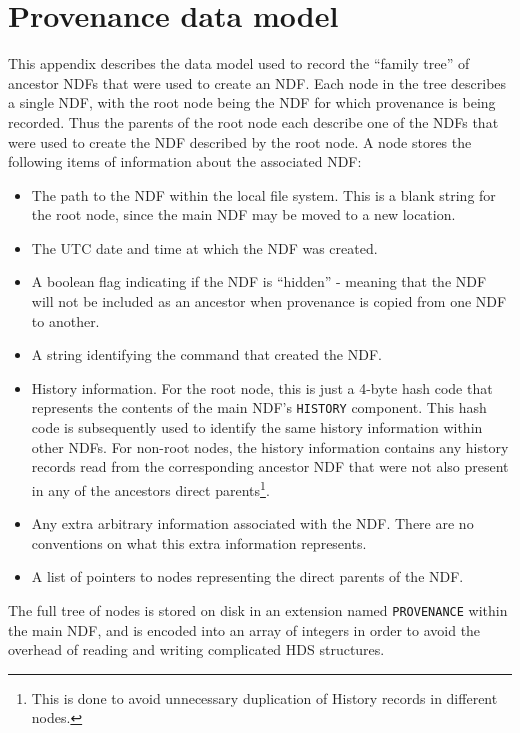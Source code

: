 \documentclass[final,authoryear,5p,times,twocolumn]{elsarticle}
\begin{document}
\section{Provenance data model}
\label{app:prov}

This appendix describes the data model used to record the ``family tree'' of
ancestor NDFs that were used to create an NDF. Each node in the tree
describes a single NDF, with the root node being the NDF for which
provenance is being recorded. Thus the parents of the root node each
describe one of the NDFs that were used to create the NDF described by the
root node. A node stores the following items of information about the
associated NDF:

\begin{itemize}
\item The path to the NDF within the local file system. This is a blank
string for the root node, since the main NDF may be moved to a new location.
\item The UTC date and time at which the NDF was created.
\item A boolean flag indicating if the NDF is ``hidden'' - meaning that
the NDF will not be included as an ancestor when provenance is copied
from one NDF to another.
\item A string identifying the command that created the NDF.
\item History information. For the root node, this is just a 4-byte hash code
that represents the contents of the main NDF's \texttt{HISTORY} component. This hash
code is subsequently used to identify the same history information within other
NDFs. For non-root nodes, the history information contains any history
records read from the corresponding ancestor NDF that were not also present
in any of the ancestors direct parents\footnote{This is done to avoid unnecessary
duplication of History records in different nodes.}.
\item Any extra arbitrary information associated with the NDF. There are no conventions on what this extra information
represents.
\item A list of pointers to nodes representing the direct parents of the
NDF.
\end{itemize}

The full tree of nodes is stored on disk in an extension named
\texttt{PROVENANCE} within the main NDF, and is encoded into an array of
integers in order to avoid the overhead of reading and writing complicated
HDS structures.
\end{document}

